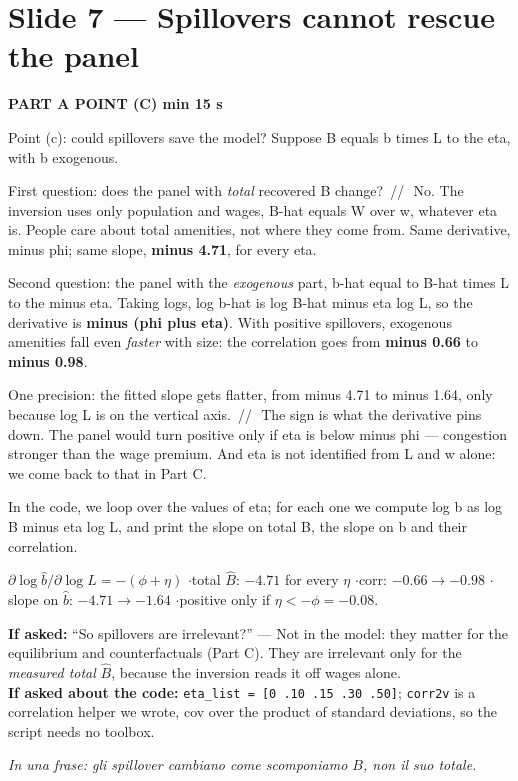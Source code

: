 \documentclass[11pt,a4paper]{article}
\newcommand{\slide}[3]{\Needspace{14\baselineskip}\section{#1}\textcolor{unicared}{\small\bfseries\MakeUppercase{#3}\quad\textperiodcentered\quad #2}\par}
\newcommand{\idea}[1]{\par{\small\itshape\color{unicablue}In una frase: #1}\par}
\newcommand{\pause}{\textcolor{unicared}{\,/\!/\,}}
\begin{document}
\slide{Slide 7 --- Spillovers cannot rescue the panel}{1 min 15 s}{Part A \textperiodcentered{} point (c)}

\begin{say}
Point (c): could spillovers save the model? Suppose B equals b times L to the eta, with b exogenous.

First question: does the panel with \emph{total} recovered B change? \pause\ No. The inversion uses only population and wages, B-hat equals W over w, whatever eta is. People care about total amenities, not where they come from. Same derivative, minus phi; same slope, \textbf{minus 4.71}, for every eta.

Second question: the panel with the \emph{exogenous} part, b-hat equal to B-hat times L to the minus eta. Taking logs, log b-hat is log B-hat minus eta log L, so the derivative is \textbf{minus (phi plus eta)}. With positive spillovers, exogenous amenities fall even \emph{faster} with size: the correlation goes from \textbf{minus 0.66} to \textbf{minus 0.98}.

One precision: the fitted slope gets flatter, from minus 4.71 to minus 1.64, only because log L is on the vertical axis. \pause\ The sign is what the derivative pins down. The panel would turn positive only if eta is below minus phi --- congestion stronger than the wage premium. And eta is not identified from L and w alone: we come back to that in Part C.

In the code, we loop over the values of eta; for each one we compute log b as log B minus eta log L, and print the slope on total B, the slope on b and their correlation.
\end{say}

\begin{nums}
$\partial\log\hat b/\partial\log L = -(\phi+\eta)$ \quad$\cdot$\quad total $\hat B$: $-4.71$ for every $\eta$ \quad$\cdot$\quad corr: $-0.66 \to -0.98$ \quad$\cdot$\quad slope on $\hat b$: $-4.71 \to -1.64$ \quad$\cdot$\quad positive only if $\eta < -\phi = -0.08$.
\end{nums}
\begin{ask}
\textbf{If asked:} ``So spillovers are irrelevant?'' --- Not in the model: they matter for the equilibrium and counterfactuals (Part C). They are irrelevant only for the \emph{measured total} $\hat B$, because the inversion reads it off wages alone. \\
\textbf{If asked about the code:} \texttt{eta\_list = [0 .10 .15 .30 .50]}; \texttt{corr2v} is a correlation helper we wrote, cov over the product of standard deviations, so the script needs no toolbox.
\end{ask}
\idea{gli spillover cambiano come scomponiamo $B$, non il suo totale.}
\end{document}

